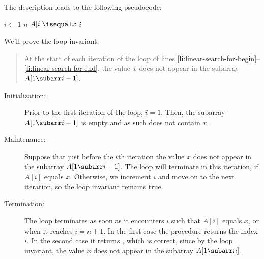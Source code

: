 The description leads to the following pseudocode:

\begin{codebox}
\li \For $i\gets1$ \To $n$ \label{li:linear-search-for-begin}
\li     \Do \If $A[i]\isequal x$
\li         \Then \Return $i$
            \End
        \End \label{li:linear-search-for-end}
\li \Return \nil
\end{codebox}

We'll prove the loop invariant:
\begin{quote}
    At the start of each iteration of the  loop of lines \ref{li:linear-search-for-begin}--\ref{li:linear-search-for-end}, the value $x$ does not appear in the subarray $A[1\subarr i-1]$.
\end{quote}

\begin{description}
    \item[Initialization:] Prior to the first iteration of the loop, $i=1$.
    Then, the subarray $A[1\subarr i-1]$ is empty and as such does not contain $x$.
    \item[Maintenance:] Suppose that just before the $i$th iteration the value $x$ does not appear in the subarray $A[1\subarr i-1]$.
    The loop will terminate in this iteration, if $A[i]$ equals $x$.
    Otherwise, we increment $i$ and move on to the next iteration, so the loop invariant remains true.
    \item[Termination:] The loop terminates as soon as it encounters $i$ such that $A[i]$ equals $x$, or when it reaches $i=n+1$.
    In the first case the procedure returns the index $i$.
    In the second case it returns \nil, which is correct, since by the loop invariant, the value $x$ does not appear in the subarray $A[1\subarr n]$.
\end{description}
